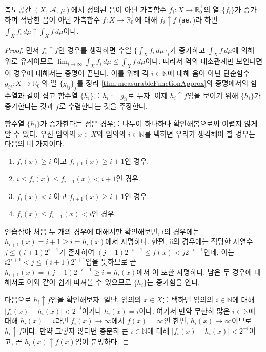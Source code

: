 \begin{theorem}
    측도공간 $(X,\,\mathcal{A},\,\mu)$에서 정의된 음이 아닌 가측함수 $f_i:X\to\overline{\mathbb{R}}^+_0$의 열 $\{f_i\}$가 증가하며 적당한 음이 아닌 가측함수 $f:X\to\overline{\mathbb{R}}^+_0$에 대해 $f_i\uparrow f$ (\texttt{ae.})라 하면 $\int_Xf_i\,d\mu\uparrow\int_Xf\,d\mu$이다.
\end{theorem}

\begin{proof}
    먼저 $f_i\uparrow f$인 경우를 생각하면 수열 $\{\int_Xf_i\,d\mu\}_i$가 증가하고 $\int_Xf\,d\mu$에 의해 위로 유계이므로 $\lim_{i\to\infty}\int_Xf_i\,d\mu\leq\int_Xf\,d\mu$이다. 따라서 역의 대소관계만 보인다면 이 경우에 대해서는 증명이 끝난다. 이를 위해 각 $i\in\mathbb{N}$에 대해 음이 아닌 단순함수 $g_{ij}:X\to\mathbb{R}^+_0$의 열 $\{g_{ij}\}_j$를 정리 \ref{thm:measurableFunctionApprox}의 증명에서의 함수열과 같이 잡고 함수열 $\{h_i\}$를 $h_i:=g_{ii}$로 두자. 이제 $h_i\uparrow f$임을 보이기 위해 $\{h_i\}$가 증가한다는 것과 $f$로 수렴한다는 것을 주장한다.

    함수열 $\{h_i\}$가 증가한다는 점은 경우를 나누어 하나하나 확인해봄으로써 어렵지 않게 알 수 있다. 우선 임의의 $x\in X$와 임의의 $i\in\mathbb{N}$를 택하면 우리가 생각해야 할 경우는 다음의 네 가지이다.
    \begin{enumerate}
        \item $f_i(x)\geq i$ 이고 $f_{i+1}(x)\geq i+1$인 경우.
        \item $i\leq f_i(x)\leq f_{i+1}(x)<i+1$인 경우.
        \item $f_i(x)<i$ 이고 $f_{i+1}(x)\geq i+1$인 경우.
        \item $f_i(x)\leq f_{i+1}(x)<i$인 경우.
    \end{enumerate}
    연습삼아 처음 두 개의 경우에 대해서만 확인해보면, i의 경우에는 $h_{i+1}(x)=i+1\geq i=h_i(x)$에서 자명하다. 한편, ii의 경우에는 적당한 자연수 $j\leq(i+1)2^{i+1}$가 존재하여 $(j-1)2^{-i-1}\leq f(x)<j2^{-i-1}$인데, 이는 $i2^{i+1}<j\leq(i+1)2^{i+1}$임을 뜻하므로 곧 $h_{i+1}(x)=(j-1)2^{-i-1}\geq i=h_i(x)$에서 이 또한 자명하다. 남은 두 경우에 대해서도 이와 같이 쉽게 따져볼 수 있으므로 $\{h_i\}$는 증가함을 안다.

    다음으로 $h_i\uparrow f$임을 확인해보자. 일단, 임의의 $x\in X$를 택하면 임의의 $i\in\mathbb{N}$에 대해 $|f_i(x)-h_i(x)|<2^{-i}$이거나 $h_i(x)=i$이다. 여기서 만약 무한히 많은 $i\in\mathbb{N}$에 대해 $h_i(x)=i$라면 $f_i(x)\to\infty$에서 $f(x)=\infty$인 한편, $h_i(x)\to\infty$이므로 $h_i\uparrow f$이다. 만약 그렇지 않다면 충분히 큰 $i\in\mathbb{N}$에 대해 $|f_i(x)-h_i(x)|<2^{-i}$이고, 곧 $h_i(x)\uparrow f(x)$임이 분명하다.


\end{proof}
